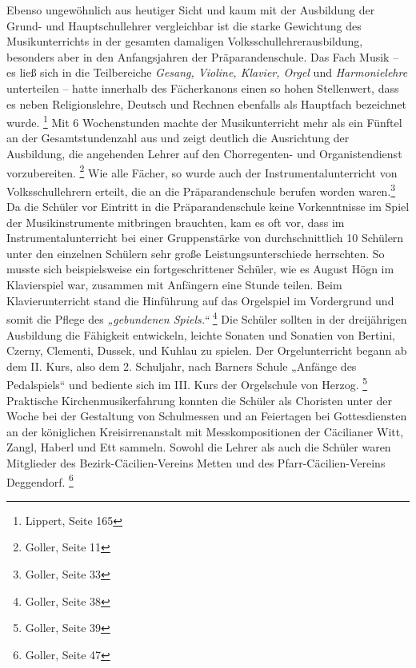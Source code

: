 \documentclass[a4paper]{article}
\newcommand\textstyleZitate[1]{\textit{#1}}
\begin{document}
Ebenso ungewöhnlich aus heutiger Sicht und kaum mit der Ausbildung der
Grund- und Hauptschullehrer vergleichbar ist die starke Gewichtung des
Musikunterrichts in der gesamten damaligen Volksschullehrerausbildung,
besonders aber in den Anfangsjahren der Präparandenschule. Das Fach
Musik – es ließ sich in die Teilbereiche \textstyleZitate{Gesang,
Violine, Klavier, Orgel }und\textstyleZitate{ Harmonielehre
}unterteilen – hatte innerhalb des Fächerkanons einen so hohen
Stellenwert, dass es neben Religionslehre, Deutsch und Rechnen
ebenfalls als Hauptfach bezeichnet wurde. \footnote{Lippert, Seite 165}
Mit 6 Wochenstunden machte der Musikunterricht mehr als ein Fünftel an
der Gesamtstundenzahl aus und zeigt deutlich die Ausrichtung der
Ausbildung, die angehenden Lehrer auf den Chorregenten- und
Organistendienst vorzubereiten. \footnote{Goller, Seite 11} Wie alle
Fächer, so wurde auch der Instrumentalunterricht von Volksschullehrern
erteilt, die an die Präparandenschule berufen worden waren.\footnote{
Goller, Seite 33} Da die Schüler vor Eintritt in die Präparandenschule
keine Vorkenntnisse im Spiel der Musikinstrumente mitbringen brauchten,
kam es oft vor, dass im Instrumentalunterricht bei einer Gruppenstärke
von durchschnittlich 10 Schülern unter den einzelnen Schülern sehr
große Leistungsunterschiede herrschten. So musste sich beispielsweise
ein fortgeschrittener Schüler, wie es August Högn im Klavierspiel war,
zusammen mit Anfängern eine Stunde teilen. Beim Klavierunterricht stand
die Hinführung auf das Orgelspiel im Vordergrund und somit die Pflege
des \textstyleZitate{„gebundenen Spiels.“}  \footnote{Goller, Seite 38}
Die Schüler sollten in der dreijährigen Ausbildung die Fähigkeit
entwickeln, leichte Sonaten und Sonatien von Bertini, Czerny, Clementi,
Dussek, und Kuhlau zu spielen. Der Orgelunterricht begann ab dem II.
Kurs, also dem 2. Schuljahr, nach Barners Schule „Anfänge des
Pedalspiels“ und bediente sich im III. Kurs der Orgelschule von
Herzog. \footnote{Goller, Seite 39} Praktische Kirchenmusikerfahrung
konnten die Schüler als Choristen unter der Woche bei der Gestaltung
von Schulmessen und an Feiertagen bei Gottesdiensten an der königlichen
Kreisirrenanstalt mit Messkompositionen der Cäcilianer Witt, Zangl,
Haberl und Ett sammeln. Sowohl die Lehrer als auch die Schüler waren
Mitglieder des Bezirk-Cäcilien-Vereins Metten und des
Pfarr-Cäcilien-Vereins Deggendorf. \footnote{Goller, Seite 47}
\end{document}
